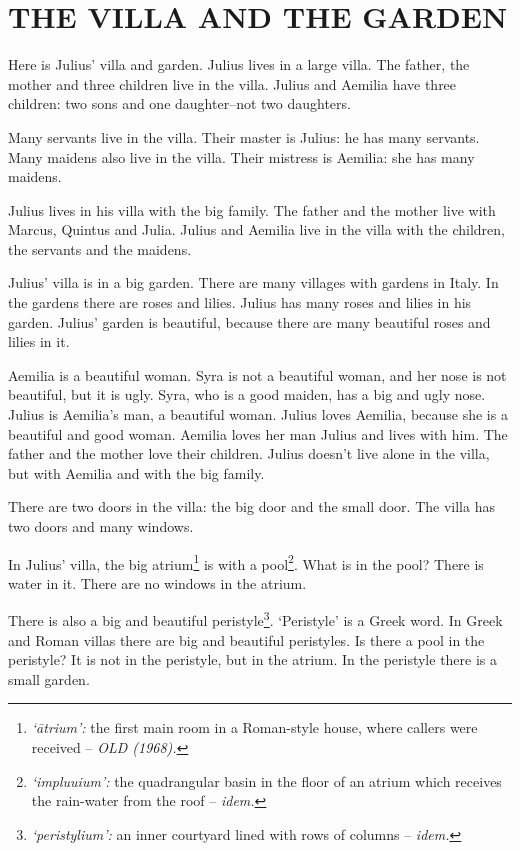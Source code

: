 
\chapter{THE VILLA AND THE GARDEN}

\linenumbers[1]

Here is Julius' villa and garden. Julius lives in a large villa. The father, the mother and three children live in the villa. Julius and Aemilia have three children: two sons and one daughter--not two daughters.

Many servants live in the villa. Their master is Julius: he has many servants. Many maidens also live in the villa. Their mistress is Aemilia: she has many maidens.

Julius lives in his villa with the big family. The father and the mother live with Marcus, Quintus and Julia. Julius and Aemilia live in the villa with the children, the servants and the maidens.

Julius' villa is in a big garden. There are many villages with gardens in Italy. In the gardens there are roses and lilies. Julius has many roses and lilies in his garden. Julius' garden is beautiful, because there are many beautiful roses and lilies in it.

Aemilia is a beautiful woman. Syra is not a beautiful woman, and her nose is not beautiful, but it is ugly. Syra, who is a good maiden, has a big and ugly nose. Julius is Aemilia's man, a beautiful woman. Julius loves Aemilia, because she is a beautiful and good woman. Aemilia loves her man Julius and lives with him. The father and the mother love their children. Julius doesn't live alone in the villa, but with Aemilia and with the big family.

There are two doors in the villa: the big door and the small door. The villa has two doors and many windows.

In Julius' villa, the big atrium\footnote{\emph{`\=atrium':} the first main room in a Roman-style house, where callers were received -- \emph{OLD (1968).}} is with a pool\footnote{\emph{`impluuium':} the quadrangular basin in the floor of an atrium which receives the rain-water from the roof -- \emph{idem.}}. What is in the pool? There is water in it. There are no windows in the atrium.

There is also a big and beautiful peristyle\footnote{\emph{`peristylium':} an inner courtyard lined with rows of columns -- \emph{idem.}}. `Peristyle' is a Greek word. In Greek and Roman villas there are big and beautiful peristyles. Is there a pool in the peristyle? It is not in the peristyle, but in the atrium. In the peristyle there is a small garden.

